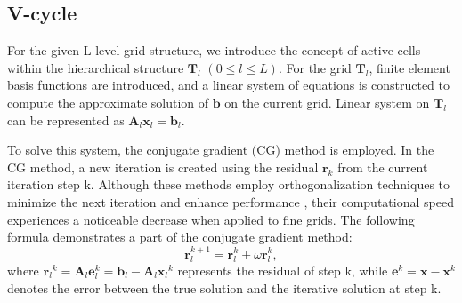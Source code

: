 \documentclass[extra, referee]{gji}
\begin{document}

\subsection{V-cycle}

For the given L-level grid structure, we introduce the concept of active cells
within the hierarchical structure ${\mathbf{T}_l}$ $(0 \leq l \leq L)$. For the
grid $\mathbf{T}_l$, finite element basis functions are introduced, and a linear
system of equations is constructed to compute the approximate solution of
$\mathbf{b}$ on the current grid. Linear system on $\mathbf{T}_l$ can be
represented as $ \mathbf{A}_l \mathbf{x}_l = \mathbf{b}_l$.

To solve this system, the conjugate gradient (CG) method
\citep{Lotfi2020,Yousif2022} is employed. In the CG method, a new iteration is
created using the residual $\mathbf{r}_k$ from the current iteration step k.
Although these methods employ orthogonalization techniques to minimize the next
iteration and enhance performance \citep{CheikAhamed2012}, their computational
speed experiences a noticeable decrease when applied to fine grids. The
following formula demonstrates a part of the conjugate gradient method:
\begin{equation}
  \label{eq:CGpart}
   \mathbf{r}^{k+1}_l=\mathbf{r}^{k}_l+\omega \mathbf{r}^{k}_l,
\end{equation}
where $ \mathbf{r}{_l}^{k} = \mathbf{A}_l \mathbf{e}_{l}^k = \mathbf{b}_l -
\mathbf{A}_l \mathbf{x}{_l}^k$ represents the residual of step k, while
$\mathbf{e}^k = \mathbf{x} - \mathbf{x}^k$ denotes the error between the true
solution and the iterative solution at step k.
\end{document}
